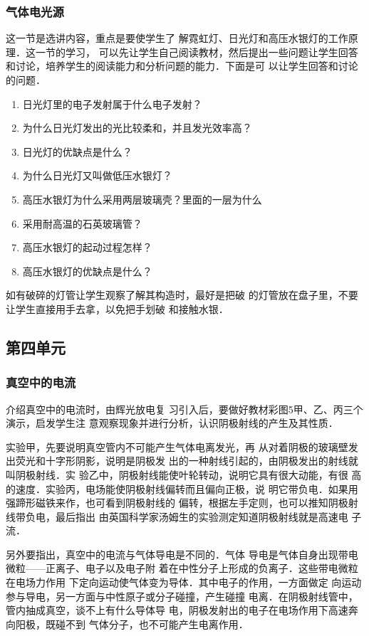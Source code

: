 \subsubsection{气体电光源}

这一节是选讲内容，重点是要使学生了
解霓虹灯、日光灯和高压水银灯的工作原理．这一节的学习，
可以先让学生自己阅读教材，然后提出一些问题让学生回答
和讨论，培养学生的阅读能力和分析问题的能力．下面是可
以让学生回答和讨论的问题．
\begin{enumerate}
\item 日光灯里的电子发射属于什么电子发射？
\item 为什么日光灯发出的光比较柔和，并且发光效率高？
\item 日光灯的优缺点是什么？
\item 为什么日光灯又叫做低压水银灯？
\item 高压水银灯为什么采用两层玻璃壳？里面的一层为什么
\item 采用耐高温的石英玻璃管？
\item 高压水银灯的起动过程怎样？
\item 高压水银灯的优缺点是什么？
\end{enumerate}

如有破碎的灯管让学生观察了解其构造时，最好是把破
的灯管放在盘子里，不要让学生直接用手去拿，以免把手划破
和接触水银．

\subsection{第四单元}
\subsubsection{真空中的电流}

介绍真空中的电流时，由辉光放电复
习引入后，要做好教材彩图5甲、乙、丙三个演示，启发学生注
意观察现象并进行分析，认识阴极射线的产生及其性质．

实验甲，先要说明真空管内不可能产生气体电离发光，再
从对着阴极的玻璃壁发出荧光和十字形阴影，说明是阴极发
出的一种射线引起的，由阴极发出的射线就叫阴极射线．实
验乙中，阴极射线能使叶轮转动，说明它具有很大动能，有很
高的速度．实验丙，电场能使阴极射线偏转而且偏向正极，说
明它带负电．如果用强蹄形磁铁来作，也可看到阴极射线的
偏转，根据左手定则，也可以推知阴极射线带负电，最后指出
由英国科学家汤姆生的实验测定知道阴极射线就是高速电
子流．

另外要指出，真空中的电流与气体导电是不同的．气体
导电是气体自身出现带电微粒——正离子、电子以及电子附
着在中性分子上形成的负离子．这些带电微粒在电场力作用
下定向运动使气体变为导体．其中电子的作用，一方面做定
向运动参与导电，另一方面与中性原子或分子碰撞，产生碰撞
电离．在阴极射线管中，管内抽成真空，谈不上有什么导体导
电，阴极发射出的电子在电场作用下高速奔向阳极，既碰不到
气体分子，也不可能产生电离作用．

